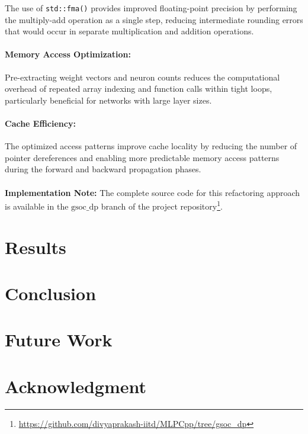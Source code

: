 \documentclass{article}
\begin{document}

The use of \texttt{std::fma()} provides improved floating-point precision by performing the multiply-add operation as a single step, reducing intermediate rounding errors that would occur in separate multiplication and addition operations.

\paragraph{Memory Access Optimization:}
Pre-extracting weight vectors and neuron counts reduces the computational overhead of repeated array indexing and function calls within tight loops, particularly beneficial for networks with large layer sizes.

\paragraph{Cache Efficiency:}
The optimized access patterns improve cache locality by reducing the number of pointer dereferences and enabling more predictable memory access patterns during the forward and backward propagation phases.
\\
\\
\noindent\textbf{Implementation Note:} The complete source code for this refactoring approach is available in the \texttt{$\text{gsoc\_dp}$} branch of the project repository\footnote{\url{https://github.com/divyaprakash-iitd/MLPCpp/tree/gsoc_dp}}.

\section{Results}

\section{Conclusion}

\section{Future Work}

\section{Acknowledgment}

\clearpage
\printbibliography
\end{document}
